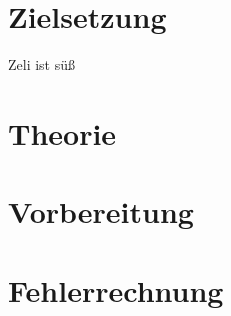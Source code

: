 


\section{Zielsetzung}

Zeli ist süß
\label{sec:Theorie}

\section{Theorie}

\section{Vorbereitung}

\section{Fehlerrechnung}
